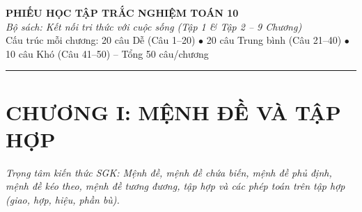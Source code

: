 \documentclass[11pt,a4paper]{article}
\begin{document}
\begin{center}
  {\LARGE\bfseries\color{primary} PHIẾU HỌC TẬP TRẮC NGHIỆM TOÁN 10}\\[4pt]
  {\normalsize\itshape\color{accent} Bộ sách: Kết nối tri thức với cuộc sống (Tập 1 \& Tập 2 – 9 Chương)}\\[4pt]
  {\small Cấu trúc mỗi chương: 20 câu Dễ (Câu 1--20) $\bullet$ 20 câu Trung bình (Câu 21--40) $\bullet$ 10 câu Khó (Câu 41--50) -- Tổng 50 câu/chương}
\end{center}
\vspace{6pt}\hrule\vspace{10pt}
\section*{\color{primary} CHƯƠNG I: MỆNH ĐỀ VÀ TẬP HỢP}
\textit{Trọng tâm kiến thức SGK: Mệnh đề, mệnh đề chứa biến, mệnh đề phủ định, mệnh đề kéo theo, mệnh đề tương đương, tập hợp và các phép toán trên tập hợp (giao, hợp, hiệu, phần bù).}\par\vspace{4pt}
\end{document}
